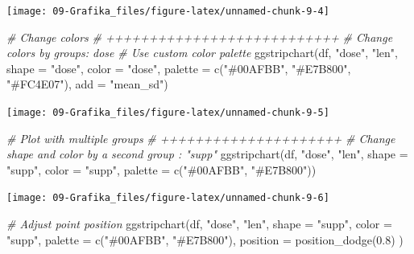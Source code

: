 \documentclass[
]{book}
\newenvironment{Shaded}{\begin{snugshade}}{\end{snugshade}}
\newcommand{\AttributeTok}[1]{\textcolor[rgb]{0.77,0.63,0.00}{#1}}
\newcommand{\CommentTok}[1]{\textcolor[rgb]{0.56,0.35,0.01}{\textit{#1}}}
\newcommand{\FloatTok}[1]{\textcolor[rgb]{0.00,0.00,0.81}{#1}}
\newcommand{\FunctionTok}[1]{\textcolor[rgb]{0.00,0.00,0.00}{#1}}
\newcommand{\NormalTok}[1]{#1}
\newcommand{\StringTok}[1]{\textcolor[rgb]{0.31,0.60,0.02}{#1}}
\begin{document}
\begin{center}\texttt{[image: 09-Grafika\_files/figure-latex/unnamed-chunk-9-4]} \end{center}

\begin{Shaded}
\begin{Highlighting}[]


\CommentTok{\# Change colors}
\CommentTok{\# +++++++++++++++++++++++++++}
\CommentTok{\# Change colors by groups: dose}
\CommentTok{\# Use custom color palette}
 \FunctionTok{ggstripchart}\NormalTok{(df, }\StringTok{"dose"}\NormalTok{, }\StringTok{"len"}\NormalTok{,  }\AttributeTok{shape =} \StringTok{"dose"}\NormalTok{,}
   \AttributeTok{color =} \StringTok{"dose"}\NormalTok{, }\AttributeTok{palette =} \FunctionTok{c}\NormalTok{(}\StringTok{"\#00AFBB"}\NormalTok{, }\StringTok{"\#E7B800"}\NormalTok{, }\StringTok{"\#FC4E07"}\NormalTok{),}
   \AttributeTok{add =} \StringTok{"mean\_sd"}\NormalTok{)}
\end{Highlighting}
\end{Shaded}

\begin{center}\texttt{[image: 09-Grafika\_files/figure-latex/unnamed-chunk-9-5]} \end{center}

\begin{Shaded}
\begin{Highlighting}[]



\CommentTok{\# Plot with multiple groups}
\CommentTok{\# +++++++++++++++++++++}
\CommentTok{\# Change shape and color by a second group : "supp"}
\FunctionTok{ggstripchart}\NormalTok{(df, }\StringTok{"dose"}\NormalTok{, }\StringTok{"len"}\NormalTok{, }\AttributeTok{shape =} \StringTok{"supp"}\NormalTok{,}
  \AttributeTok{color =} \StringTok{"supp"}\NormalTok{, }\AttributeTok{palette =} \FunctionTok{c}\NormalTok{(}\StringTok{"\#00AFBB"}\NormalTok{, }\StringTok{"\#E7B800"}\NormalTok{))}
\end{Highlighting}
\end{Shaded}

\begin{center}\texttt{[image: 09-Grafika\_files/figure-latex/unnamed-chunk-9-6]} \end{center}

\begin{Shaded}
\begin{Highlighting}[]

\CommentTok{\# Adjust point position}
\FunctionTok{ggstripchart}\NormalTok{(df, }\StringTok{"dose"}\NormalTok{, }\StringTok{"len"}\NormalTok{, }\AttributeTok{shape =} \StringTok{"supp"}\NormalTok{,}
  \AttributeTok{color =} \StringTok{"supp"}\NormalTok{, }\AttributeTok{palette =} \FunctionTok{c}\NormalTok{(}\StringTok{"\#00AFBB"}\NormalTok{, }\StringTok{"\#E7B800"}\NormalTok{),}
  \AttributeTok{position =} \FunctionTok{position\_dodge}\NormalTok{(}\FloatTok{0.8}\NormalTok{) )}
\end{Highlighting}
\end{Shaded}
\end{document}
